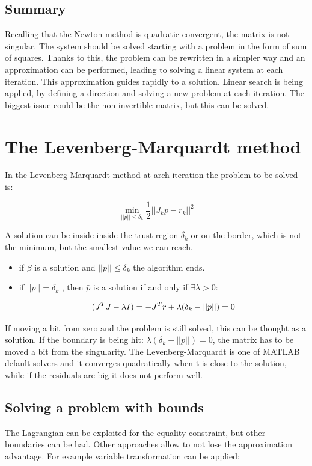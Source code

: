  \subsection{Summary}
  Recalling that the Newton method is quadratic convergent, the matrix is not singular.
  The system should be solved starting with a problem in the form of sum of squares.
  Thanks to this, the problem can be rewritten in a simpler way and an approximation can be performed, leading to solving a linear system at each iteration.
  This approximation guides  rapidly to a solution.
  Linear search is being applied, by defining a direction and solving a new problem at each iteration.
  The biggest issue could be the non invertible matrix, but this can be solved.


\section{The Levenberg-Marquardt method}
In the Levenberg-Marquardt method at arch iteration the problem to be solved is:

$$\min_{||p||\leq\delta_k} \frac{1}{2} ||J_kp-r_k||^2$$

A solution can be inside inside the trust region $\delta_k$ or on the border, which is not the minimum, but the smallest value we can reach.

\begin{multicols}{2}
  \begin{itemize}
    \item if $\beta$ is a solution and $||p||\leq\delta_k$ the algorithm ends.
    \item if $||p||=\delta_k$ , then $\bar{p}$ is a solution if and only if
      $\exists \lambda > 0$:

      $$(J^TJ-\lambda I)=-J^Tr \\ + \lambda(\delta_k-||p||)=0$$
  \end{itemize}
\end{multicols}
\noindent

If moving a bit from zero and the problem is still solved, this can be thought as a solution.
If the boundary is being hit: $\lambda(\delta_k-||p||)=0$, the matrix has to be moved a bit from the singularity.
The Levenberg-Marquardt is one of MATLAB default solvers and it converges quadratically when t is close to the solution, while if the residuals are big it does not perform well.

  \subsection{Solving a problem with bounds}
  The Lagrangian can be exploited for the equality constraint, but other boundaries can be had.
  Other approaches allow to not lose the approximation advantage.
  For example variable transformation can be applied:

